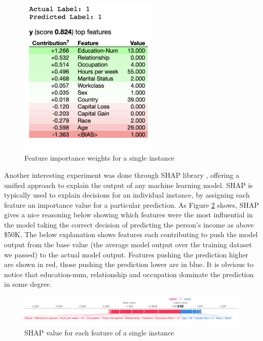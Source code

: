 \documentclass[runningheads]{llncs}
\begin{document}
	\begin{figure}
		\centering
		\includegraphics[width=0.6\textwidth]{img/individual_importance.png}
		\caption{Feature importance weights for a single instance}
		\label{fig:individual_importance}
	\end{figure}
	
	Another interesting experiment was done through SHAP library \cite{lundberg2017unified}, offering a unified approach to explain the output of any machine learning model. SHAP is typically used to explain decisions for an individual instance, by assigning each feature an importance value for a particular prediction. As Figure \ref{fig:shap} shows, SHAP gives a nice reasoning below showing which features were the most influential in the model taking the correct decision of predicting the person’s income as above \$50K. The below explanation shows features each contributing to push the model output from the base value (the average model output over the training dataset we passed) to the actual model output. Features pushing the prediction higher are shown in red, those pushing the prediction lower are in blue. It is obvious to notice that education-num, relationship and occupation dominate the prediction in some degree. 
	
	\begin{figure}
		\centering
		\includegraphics[width=1.2\textwidth]{img/shap.png}
		\caption{SHAP value for each feature of a single instance}
		\label{fig:shap}
	\end{figure}
	
\end{document}
